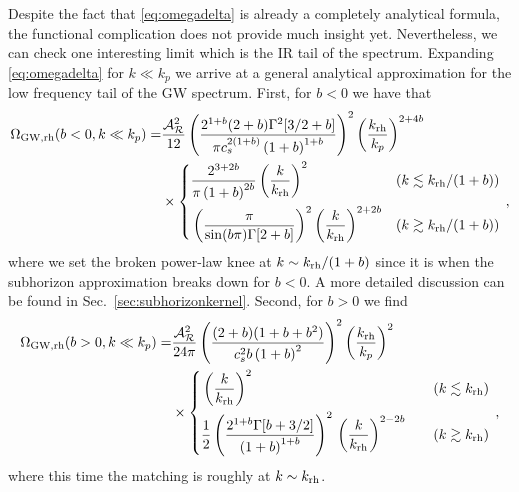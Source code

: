 \documentclass[a4paper,11pt]{article}
\numberwithin{equation}{section}
\begin{document}
Despite the fact that \eqref{eq:omegadelta} is already a completely analytical formula, the functional complication does not provide much insight yet. Nevertheless, we can check one interesting limit which is the IR tail of the spectrum. Expanding \eqref{eq:omegadelta} for $k\ll k_p$ we arrive at a general analytical approximation for the low frequency tail of the GW spectrum.  First, for $b<0$ we have that
\begin{align}\label{eq:OMbn}
\Omega_{\rm GW,rh}(b<0,k\ll k_p)=&\frac{{\cal A}^2_{\cal R}}{12}\left(\frac{2^{1+b}(2+b)\Gamma^2[3/2+b]}{\pi c_s^{2(1+b)}\left(1+b\right)^{1+b}}\right)^2\left(\frac{k_{\rm rh}}{k_p}\right)^{2+4b}\nonumber\\&\times\left\{
\begin{aligned}
&\frac{2^{3+2b}}{\pi\left(1+b\right)^{2b}}\left(\frac{k}{k_{\rm rh}}\right)^{2} &(k\lesssim k_{\rm rh}/(1+b))\\
&\left(\frac{\pi}{\sin(b\pi)\Gamma[2+b]}\right)^2\left(\frac{k}{k_{\rm rh}}\right)^{2+2b}  &(k\gtrsim k_{\rm rh}/(1+b))
\end{aligned}
\right.\,,
\end{align}
where we set the broken power-law knee at $k\sim k_{\rm rh}/(1+b)$ since it is when the subhorizon approximation breaks down for $b<0$. A more detailed discussion can be found in Sec.~\ref{sec:subhorizonkernel}.
Second, for $b>0$ we find
\begin{align}\label{eq:OMbp}
\Omega_{\rm GW,rh}(b>0,k\ll k_p)=&\frac{{\cal A}^2_{\cal R}}{{24\pi}}\left(\frac{(2+b)(1+b+b^2)}{c_s^2b\left(1+b\right)^{2}}\right)^2\left(\frac{k_{\rm rh}}{k_p}\right)^{2}\nonumber\\&\times
\left\{
\begin{aligned}
&\left(\frac{k}{k_{\rm rh}}\right)^{2}\quad &(k\lesssim k_{\rm rh})\\
&\frac{1}{2}\left(\frac{{2^{1+b}}\Gamma[b+3/2]}{\left(1+b\right)^{1+b}}\right)^2\,\left(\frac{k}{k_{\rm rh}}\right)^{2-2b}\quad &(k\gtrsim k_{\rm rh})
\end{aligned}
\right.\,,
\end{align}
where this time the matching is roughly at $k\sim k_{\rm rh}$.
\end{document}
